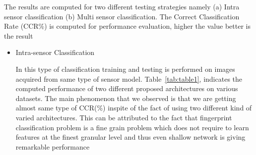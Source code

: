 \documentclass[12pt, a4paper,twoside]{article}
\begin{document}
	The results are computed for two different testing strategies namely (a) Intra sensor classification (b) Multi sensor classification. The Correct Classification Rate (CCR\%) is computed for performance evaluation, higher the value better is the result


	\begin{itemize}
		\item {Intra-sensor Classification}

		In this type of classification training and testing is performed on images acquired from same type of sensor model. Table~\ref{tab:table1}, indicates the computed performance of two different proposed architectures on various datasets. The main phenomenon that we observed is that we are getting almost same type of CCR(\%) inspite of the fact of using two different kind of varied architectures. This can be attributed to the fact that fingerprint classification problem is a fine grain problem which does not require to learn features at the finest granular level and thus even shallow network is giving remarkable performance
	\end{itemize}
\end{document}
